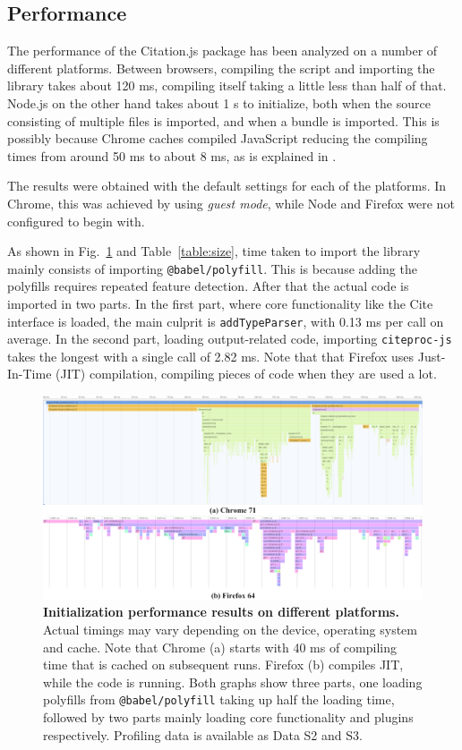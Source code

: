 \documentclass[fleqn,10pt,lineno]{wlpeerj} %
\begin{document}
\subsection*{Performance}

The performance of the Citation.js package has been analyzed on a number of different platforms. Between browsers, compiling the script and importing the library takes about 120 ms, compiling itself taking a little less than half of that. Node.js on the other hand takes about 1 s to initialize, both when the source consisting of multiple files is imported, and when a bundle is imported. This is possibly because Chrome caches compiled JavaScript reducing the compiling times from around 50 ms to about 8 ms, as is explained in \cite{alle_improved_2018}.

The results were obtained with the default settings for each of the platforms. In Chrome, this was achieved by using \emph{guest mode}, while Node and Firefox were not configured to begin with.

As shown in Fig.~\ref{fig:perf} and Table~\ref{table:size}, time taken to import the library mainly consists of importing \texttt{@babel/polyfill}. This is because adding the polyfills requires repeated feature detection. After that the actual code is imported in two parts. In the first part, where core functionality like the Cite interface is loaded, the main culprit is \texttt{addTypeParser}, with 0.13 ms per call on average. In the second part, loading output-related code, importing \texttt{citeproc-js} takes the longest with a single call of 2.82 ms.
Note that that Firefox uses Just-In-Time (JIT) compilation, compiling pieces of code when they are used a lot.

\begin{figure}[bt!]
\includegraphics[width=\linewidth]{figures/Figure_6.png}
\caption{\textbf{Initialization performance results on different platforms.}
Actual timings may vary depending on the device, operating system and cache. Note that Chrome (a) starts with 40 ms of compiling time that is cached on subsequent runs. Firefox (b) compiles JIT, while the code is running. Both graphs show three parts, one loading polyfills from \texttt{@babel/polyfill} taking up half the loading time, followed by two parts mainly loading core functionality and plugins respectively. Profiling data is available as Data S2 and S3.}
\label{fig:perf}
\end{figure}
\end{document}
